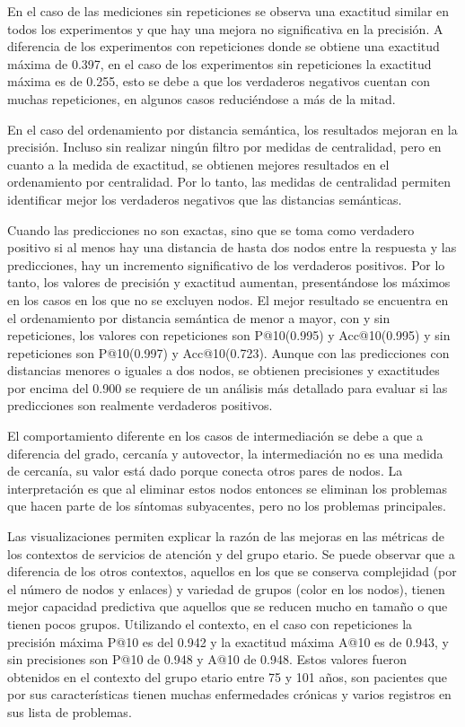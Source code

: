 En el caso de las mediciones sin repeticiones se observa una exactitud similar en todos los experimentos y que hay una mejora no significativa en la precisión. A diferencia de los experimentos con repeticiones donde se obtiene una exactitud máxima de \num{0,397}, en el caso de los experimentos sin repeticiones la exactitud máxima es de \num{0,255}, esto se debe a que los verdaderos negativos cuentan con muchas repeticiones, en algunos casos reduciéndose a más de la mitad.

En el caso del ordenamiento por distancia semántica,  los resultados mejoran  en la precisión. Incluso sin realizar ningún filtro por medidas de centralidad, pero en cuanto a la medida de exactitud, se obtienen mejores resultados en el ordenamiento por centralidad. Por lo tanto, las medidas de centralidad permiten identificar mejor los verdaderos negativos que las distancias semánticas.

Cuando las predicciones no son exactas, sino que se toma como verdadero positivo si al menos hay una distancia de hasta dos nodos entre la respuesta y las predicciones, hay un incremento significativo de los verdaderos positivos. Por lo tanto, los valores de precisión y exactitud aumentan, presentándose los máximos en los casos en los que no se excluyen nodos.  El mejor resultado se encuentra en el ordenamiento por distancia semántica de menor a mayor, con y sin repeticiones, los valores con repeticiones son P@10(\num{0,995}) y Acc@10(\num{0,995}) y sin repeticiones son P@10(\num{0,997}) y Acc@10(\num{0,723}).  Aunque con las predicciones con distancias menores o iguales a dos nodos, se obtienen precisiones y exactitudes por encima del \num{0.900} se requiere de un análisis más detallado para evaluar si las predicciones son realmente verdaderos positivos. 

El comportamiento diferente en los casos de intermediación se debe a que a diferencia del grado, cercanía y autovector, la intermediación no es una medida de cercanía, su valor está dado porque conecta otros pares de nodos. La interpretación es que al eliminar estos nodos entonces se eliminan los problemas que hacen parte de los síntomas subyacentes, pero no los problemas principales.

Las visualizaciones permiten explicar la razón de las mejoras en las métricas de los contextos de servicios de atención y del grupo etario. Se puede observar que a diferencia de los otros contextos, aquellos en los que se conserva complejidad (por el número de nodos y enlaces) y variedad de grupos (color en los nodos), tienen mejor capacidad predictiva que aquellos que se reducen mucho en tamaño o que tienen pocos grupos. Utilizando el contexto, en el caso con repeticiones la precisión máxima P@10 es del \num{0.942} y la exactitud máxima A@10 es de \num{0.943}, y sin precisiones son P@10 de \num{0.948} y A@10 de \num{0.948}. Estos valores fueron obtenidos en el contexto del grupo etario entre 75 y 101 años, son pacientes que por sus características tienen muchas enfermedades crónicas y varios registros en sus lista de problemas. 

